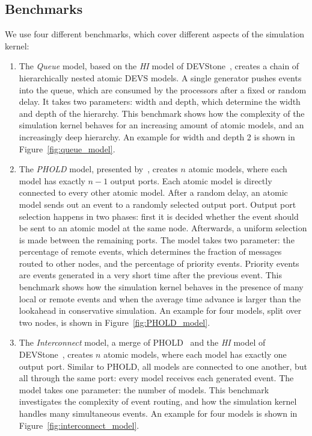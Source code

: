 \subsection{Benchmarks}
We use four different benchmarks, which cover different aspects of the simulation kernel:
\begin{enumerate}
	\item The \textit{Queue} model, based on the \textit{HI} model of DEVStone~\cite{DEVStone}, creates a chain of hierarchically nested atomic \textsf{DEVS} models.
	A single generator pushes events into the queue, which are consumed by the processors after a fixed or random delay.
	It takes two parameters: width and depth, which determine the width and depth of the hierarchy.
	This benchmark shows how the complexity of the simulation kernel behaves for an increasing amount of atomic models, and an increasingly deep hierarchy.
	An example for width and depth 2 is shown in Figure~\ref{fig:queue_model}.
	
	\item The \textit{PHOLD} model, presented by~\cite{PHOLD}, creates $n$ atomic models, where each model has exactly $n-1$ output ports.
	Each atomic model is directly connected to every other atomic model.
	After a random delay, an atomic model sends out an event to a randomly selected output port.
	Output port selection happens in two phases: first it is decided whether the event should be sent to an atomic model at the same node.
	Afterwards, a uniform selection is made between the remaining ports.
	The model takes two parameter: the percentage of remote events, which determines the fraction of messages routed to other nodes, and the percentage of priority events. Priority events are events generated in a very short time after the previous event.
	This benchmark shows how the simulation kernel behaves in the presence of many local or remote events and when the average time advance is larger than the lookahead in conservative simulation.
	An example for four models, split over two nodes, is shown in Figure~\ref{fig:PHOLD_model}.
	
	\item The \textit{Interconnect} model, a merge of PHOLD~\cite{PHOLD} and the \textit{HI} model of DEVStone~\cite{DEVStone}, creates $n$ atomic models, where each model has exactly one output port.
	Similar to PHOLD, all models are connected to one another, but all through the same port: every model receives each generated event.
	The model takes one parameter: the number of models.
	This benchmark investigates the complexity of event routing, and how the simulation kernel handles many simultaneous events.
	An example for four models is shown in Figure~\ref{fig:interconnect_model}.
	

\end{enumerate}
